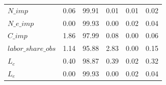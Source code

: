 \begin{center}
\begin{longtable}{lccccc}
$N\_imp             $	 & 	           0.06	 & 	          99.91	 & 	           0.01	 & 	           0.01	 & 	           0.02 \\ 
$N\_e\_imp          $	 & 	           0.00	 & 	          99.93	 & 	           0.00	 & 	           0.02	 & 	           0.04 \\ 
$C\_imp             $	 & 	           1.86	 & 	          97.99	 & 	           0.08	 & 	           0.00	 & 	           0.06 \\ 
$labor\_share\_obs  $	 & 	           1.14	 & 	          95.88	 & 	           2.83	 & 	           0.00	 & 	           0.15 \\ 
${L_c}              $	 & 	           0.40	 & 	          98.87	 & 	           0.39	 & 	           0.02	 & 	           0.32 \\ 
${L_e}              $	 & 	           0.00	 & 	          99.93	 & 	           0.00	 & 	           0.02	 & 	           0.04 \\ 
\end{longtable}
 \end{center}
